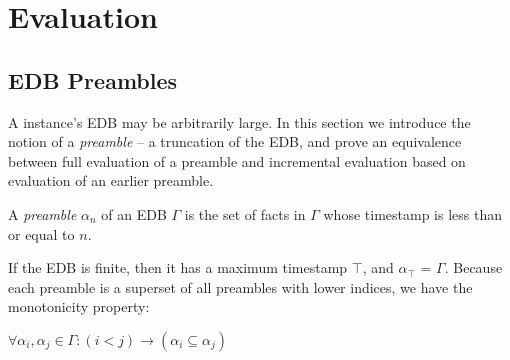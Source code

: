 \section{Evaluation}


\subsection{EDB Preambles}


A \slang instance's EDB may be arbitrarily large.  In this section we introduce
the notion of a {\em preamble} -- a truncation of the EDB, and prove an
equivalence between full evaluation of a preamble and incremental evaluation
based on evaluation of an earlier preamble.


\begin{definition}
A \emph{preamble} $\alpha_{n}$ of an EDB $\Gamma$ is the set of facts in $\Gamma$ whose timestamp is less than or equal to $n$.
\end{definition}

If the EDB is finite, then it has a maximum timestamp $\top$,  and
$\alpha_{\top}$ = $\Gamma$.  
Because each preamble is a superset of all preambles with lower indices, we
have the monotonicity property:

$\forall \alpha_{i}, \alpha_{j} \in \Gamma : (i < j) \to (\alpha_{i} \subseteq \alpha_{j})$


%
%

